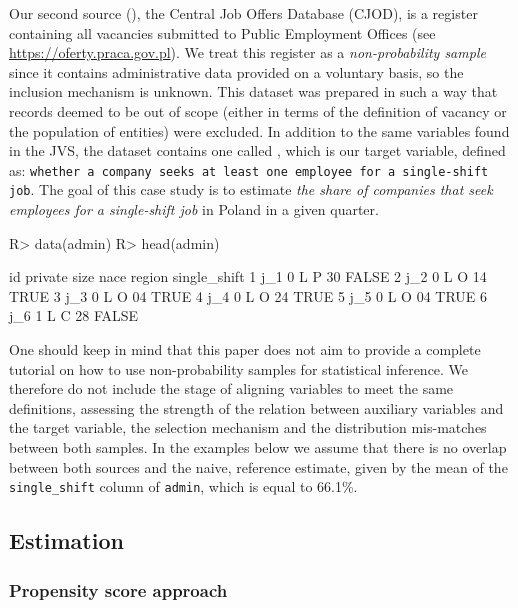 \documentclass[
]{jss}
\begin{document}
Our second source (), the Central Job Offers Database
(CJOD), is a register containing all vacancies submitted to Public
Employment Offices (see \url{https://oferty.praca.gov.pl}). We treat
this register as a \textit{non-probability sample} since it contains
administrative data provided on a voluntary basis, so the inclusion
mechanism is unknown. This dataset was prepared in such a way that
records deemed to be out of scope (either in terms of the definition of
vacancy or the population of entities) were excluded. In addition to the
same variables found in the JVS, the dataset contains one called
, which is our target variable, defined as:
\texttt{whether a company seeks at least one employee for a single-shift job}.
The goal of this case study is to estimate
\textit{the share of companies that seek employees for a single-shift job}
in Poland in a given quarter.

\begin{CodeChunk}
\begin{CodeInput}
R> data(admin)
R> head(admin)
\end{CodeInput}
\begin{CodeOutput}
   id private size nace region single_shift
1 j_1       0    L    P     30        FALSE
2 j_2       0    L    O     14         TRUE
3 j_3       0    L    O     04         TRUE
4 j_4       0    L    O     24         TRUE
5 j_5       0    L    O     04         TRUE
6 j_6       1    L    C     28        FALSE
\end{CodeOutput}
\end{CodeChunk}

One should keep in mind that this paper does not aim to provide a
complete tutorial on how to use non-probability samples for statistical
inference. We therefore do not include the stage of aligning variables
to meet the same definitions, assessing the strength of the relation
between auxiliary variables and the target variable, the selection
mechanism and the distribution mis-matches between both samples. In the
examples below we assume that there is no overlap between both sources
and the naive, reference estimate, given by the mean of the
\texttt{single\_shift} column of \texttt{admin}, which is equal to
66.1\%.

\subsection{Estimation}\label{estimation}

\subsubsection{Propensity score
approach}\label{propensity-score-approach}
\end{document}
